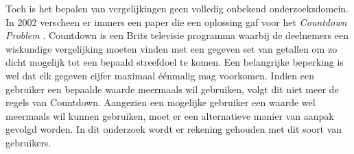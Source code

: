 \documentclass[Main.tex]{subfiles}
\begin{document}
Toch is het bepalen van vergelijkingen geen volledig onbekend onderzoeksdomein. In 2002 verscheen er immers een paper die een oplossing gaf voor het \textit{Countdown Problem} \cite{countdown}. Countdown is een Brits televisie programma waarbij de deelnemers een wiskundige vergelijking moeten vinden met een gegeven set van getallen om zo dicht mogelijk tot een bepaald streefdoel te komen. Een belangrijke beperking is wel dat elk gegeven cijfer maximaal \'e\'enmalig mag voorkomen. Indien een gebruiker een bepaalde waarde meermaals wil gebruiken, volgt dit niet meer de regels van Countdown. Aangezien een mogelijke gebruiker een waarde wel meermaals wil kunnen gebruiken, moet er een alternatieve manier van aanpak gevolgd worden. In dit onderzoek wordt er rekening gehouden met dit soort van gebruikers.
\end{document}
